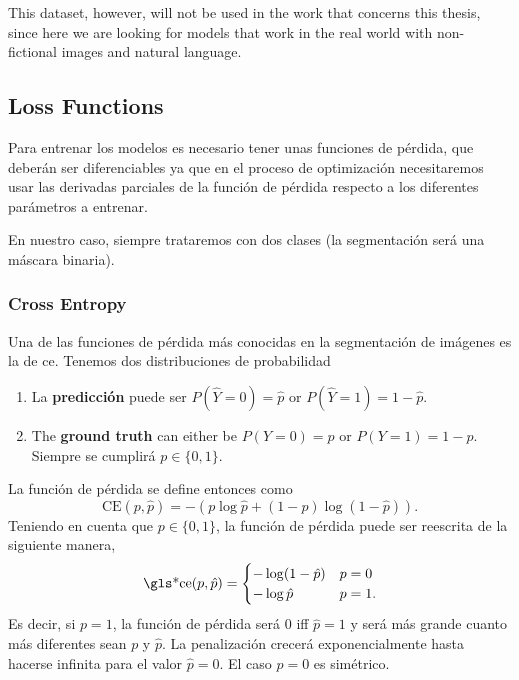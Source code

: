 This dataset, however, will not be used in the work that concerns this thesis,
since here we are looking for models that work in the real world with
non-fictional images and natural language.

\subsection{Loss Functions}

Para entrenar los modelos es necesario tener unas funciones de pérdida, que
deberán ser diferenciables ya que en el proceso de optimización necesitaremos
usar las derivadas parciales de la función de pérdida respecto a los diferentes
parámetros a entrenar.

En nuestro caso, siempre trataremos con dos clases (la segmentación será una
máscara binaria).

\subsubsection{Cross Entropy}
Una de las funciones de pérdida más conocidas en la segmentación de imágenes es
la de \gls{ce}. Tenemos dos distribuciones de probabilidad

\begin{enumerate}
  \item La \textbf{predicción} puede ser \(P(\hat{Y} = 0) = \hat{p}\) or
  \(P(\hat{Y} = 1) = 1 - \hat{p}\).
  \item The \textbf{ground truth} can either be \(P(Y = 0) = p\) or
  \(P(Y = 1) = 1 - p\). Siempre se cumplirá \(p \in \{0, 1\}\).
\end{enumerate}

La función de pérdida se define entonces como
\begin{equation}
  \text{CE}(p, \hat{p}) = -(p\log\hat{p} + (1 - p)\log(1 - \hat{p})).
\end{equation}
Teniendo en cuenta que \(p \in \{0, 1\}\), la función de pérdida puede ser
reescrita de la siguiente manera,
\begin{equation}
  \text{\gls*{ce}}(p, \hat{p}) =
  \begin{cases}
    -\log(1 - \hat{p}) & p = 0 \\
    -\log\hat{p} & p = 1.
  \end{cases}
\end{equation}
Es decir, si \(p = 1\), la función de pérdida será \(0\) \gls{iff} \(\hat{p} =
1\) y será más grande cuanto más diferentes sean \(p\) y \(\hat{p}\). La
penalización crecerá exponencialmente hasta hacerse infinita para el valor
\(\hat{p} = 0\). El caso \(p = 0\) es simétrico.

